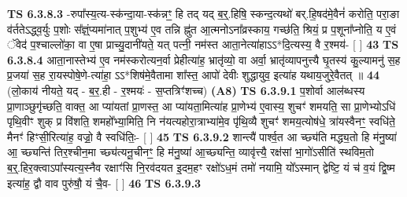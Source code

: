 \documentclass[17pt]{extarticle}
\begin{document}
                  \newline
                                \textbf{ TS 6.3.8.3} \newline
                  -रुपा᳚स्य॒त्य-स्क॑न्दा॒या-स्क॑न्नꣳ॒॒ हि तद् यद् ब॒र्॒.हिषि॒ स्कन्द॒त्यथो॑ बर्.हि॒षद॑मे॒वैनं॑ करोति॒ परा॒ङा व॑र्ततेऽद्ध्व॒र्युः प॒शोः स᳚ज्ञ्ं॒प्यमा॑नात् प॒शुभ्य॑ ए॒व तन्नि ह्नु॑त आ॒त्मनोऽना᳚व्रस्काय॒ गच्छ॑ति॒ श्रियं॒ प्र प॒शूना᳚प्नोति॒ य ए॒वं ॅवेद॑ प॒श्चाल्लो॑का॒ वा ए॒षा प्राच्यु॒दानी॑यते॒ यत् पत्नी॒ नम॑स्त आता॒नेत्या॑हाऽऽ*दि॒त्यस्य॒ वै र॒श्मय॑- [  ] \textbf{  43} \newline
                  \newline
                                \textbf{ TS 6.3.8.4} \newline
                  आता॒नास्तेभ्य॑ ए॒व नम॑स्करोत्यन॒र्वा प्रेहीत्या॑ह॒ भ्रातृ॑व्यो॒ वा अर्वा॒ भ्रातृ॑व्यापनुत्त्यै घृ॒तस्य॑ कु॒ल्यामनु॑ स॒ह प्र॒जया॑ स॒ह रा॒यस्पोषे॒णे-त्या॑हा॒ ऽऽ*शिष॑मे॒वैतामा शा᳚स्त॒ आपो॑ देवीः शुद्धायुव॒ इत्या॑ह यथाय॒जुरे॒वैतत् ॥ \textbf{  44 } \newline
                  \newline
                      (लो॒काय॑ नीयते॒ यद् - ब॒र॒.ही - र॒श्मयः॑ - स॒प्तत्रिꣳ॑शच्च)  \textbf{(A8)} \newline \newline
                                        \textbf{ TS 6.3.9.1} \newline
                  प॒शोर्वा आल॑ब्धस्य प्रा॒णाञ्छुगृ॑च्छति॒ वाक्त॒ आ प्या॑यतां प्रा॒णस्त॒ आ प्या॑यता॒मित्या॑ह प्रा॒णेभ्य॑ ए॒वास्य॒ शुचꣳ॑ शमयति॒ सा प्रा॒णेभ्योऽधि॑ पृथि॒वीꣳ शुक् प्र वि॑शति॒ शमहो᳚भ्या॒मिति॒ नि न॑यत्यहोरा॒त्राभ्या॑मे॒व पृ॑थि॒व्यै शुचꣳ॑ शमय॒त्योष॑धे॒ त्रा॑यस्वैनꣳ॒॒ स्वधि॑ते॒ मैनꣳ॑ हिꣳसी॒रित्या॑ह॒ वज्रो॒॒ वै स्वधि॑तिः॒- [  ] \textbf{  45 } \newline
                  \newline
                                \textbf{ TS 6.3.9.2} \newline
                  शान्त्यै॑ पार्श्व॒त आ च्छ्य॑ति मद्ध्य॒तो हि म॑नु॒ष्या॑ आ॒ च्छ्यन्ति॑ तिर॒श्चीन॒मा च्छ्य॑त्यनू॒चीनꣳ॒॒ हि म॑नु॒ष्या॑ आ॒च्छ्यन्ति॒ व्यावृ॑त्त्यै॒ रक्ष॑सां भा॒गो॑ऽसीति॑ स्थविम॒तो ब॒र्॒.हिर॒क्त्वाऽपा᳚स्यत्य॒स्नैव रक्षाꣳ॑सि नि॒रव॑दयत इ॒दम॒हꣳ रक्षो॑ऽध॒मं तमो॑ नयामि॒ यो᳚ऽस्मान् द्वेष्टि॒ यं च॑ व॒यं द्वि॒ष्म इत्या॑ह॒ द्वौ वाव पुरु॑षौ॒ यं चै॒व- [  ] \textbf{  46} \newline
                  \newline
                                \textbf{ TS 6.3.9.3} \newline
\end{document}
